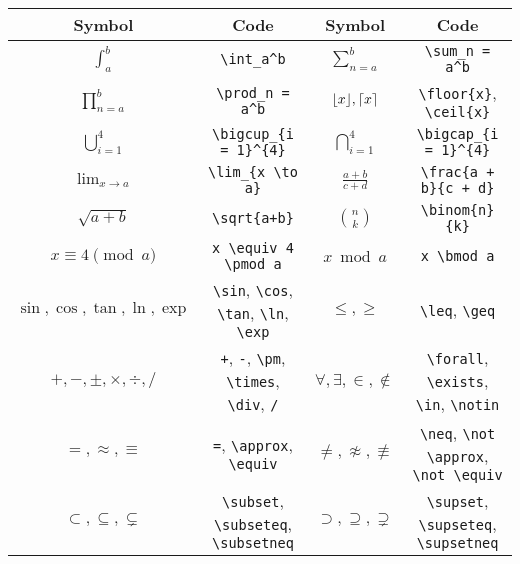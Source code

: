 \documentclass{article}
\newcommand*{\code}[1]{\texttt{#1}}
\begin{document}
\begin{table}[htb]
  \centering
  \begin{tabular}[htb]{c c c c}
  \toprule
  Symbol & Code & Symbol & Code \\ \midrule
  $\displaystyle\int_{a}^{b}$ & \code{\textbackslash{}int\_{a}\textasciicircum{}{b}} & $\displaystyle\sum_{n = a}^{b}$ & \code{\textbackslash{}sum\_{n = a}\textasciicircum{}{b}} \\
  $\displaystyle\prod_{n = a}^{b}$ & \code{\textbackslash{}prod\_{n = a}\textasciicircum{}{b}} & $\lfloor x\rfloor, \lceil x\rceil$ & \code{\textbackslash{}floor\{x\}}, \code{\textbackslash{}ceil\{x\}} \\
  $\displaystyle \bigcup_{i = 1}^{4}$ & \code{\textbackslash{}bigcup\_\{i = 1\}\textasciicircum{}\{4\}} & $\displaystyle \bigcap_{i = 1}^{4}$ & \code{\textbackslash{}bigcap\_\{i = 1\}\textasciicircum{}\{4\}}\\
  $\displaystyle\lim_{x \to a}$ & \code{\textbackslash{}lim\_\{x \textbackslash{}to a\}} & $\displaystyle\frac{a + b}{c + d}$ & \code{\textbackslash{}frac\{a + b\}\{c + d\}} \\
  $\displaystyle \sqrt{a + b}$ & \code{\textbackslash{}sqrt\{a+b\}} & $\displaystyle \binom{n}{k}$ & \code{\textbackslash{}binom\{n\}\{k\}}\\
  $x \equiv 4 \pmod a$ & \code{x \textbackslash{}equiv 4 \textbackslash{}pmod a} & $x \bmod a$ & \code{x \textbackslash{}bmod a} \\
  $\sin, \cos, \tan, \ln, \exp$ & \code{\textbackslash{}sin}, \code{\textbackslash{}cos}, \code{\textbackslash{}tan}, \code{\textbackslash{}ln}, \code{\textbackslash{}exp} & $\leq, \geq$ & \code{\textbackslash{}leq}, \code{\textbackslash{}geq} \\
  $+, -, \pm, \times, \div, /$ & \code{+}, \code{-}, \code{\textbackslash{}pm}, \code{\textbackslash{}times}, \code{\textbackslash{}div}, \code{/} & $\forall, \exists, \in, \notin$ & \code{\textbackslash{}forall}, \code{\textbackslash{}exists}, \code{\textbackslash{}in}, \code{\textbackslash{}notin} \\
  $=, \approx, \equiv$ & \code{=}, \code{\textbackslash{}approx}, \code{\textbackslash{}equiv} & $\neq, \not \approx, \not \equiv$ & \code{\textbackslash{}neq}, \code{\textbackslash{}not \textbackslash{}approx}, \code{\textbackslash{}not \textbackslash{}equiv} \\
  $\subset, \subseteq, \subsetneq$ & \code{\textbackslash{}subset}, \code{\textbackslash{}subseteq}, \code{\textbackslash{}subsetneq} & $\supset, \supseteq, \supsetneq$ & \code{\textbackslash{}supset}, \code{\textbackslash{}supseteq}, \code{\textbackslash{}supsetneq} \\

\end{tabular}
\end{table}
\end{document}
